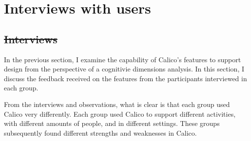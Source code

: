 \documentclass[12pt,fleqn]{ucithesis}
\providecommand{\DIFdeltex}[1]{{\protect\color{red}\sout{#1}}}                      %
\providecommand{\DIFaddbegin}{} %
\providecommand{\DIFaddend}{} %
\providecommand{\DIFdelbegin}{} %
\providecommand{\DIFdelend}{} %
\providecommand{\DIFdel}[1]{\texorpdfstring{\DIFdeltex{#1}}{}} %
\begin{document}

\DIFaddend \section{Interviews with users}
\label{discussion:interviews}


\DIFdelbegin \subsection{\DIFdel{Interviews}}
\addtocounter{subsection}{-1}%
\DIFdelend %
\DIFaddbegin 

\DIFaddend %
%

In the previous section, I examine the capability of Calico's features to support design from the perspective of a cognitivie dimensions analysis. In this section, I discuss the feedback received on the features from the participants interviewed in each group.

From the interviews and observations, what is clear is that each group used Calico very differently. Each group used Calico to support different activities, with different amounts of people, and in different settings. These groups subsequently found different strengths and weaknesses in Calico.
\end{document}
